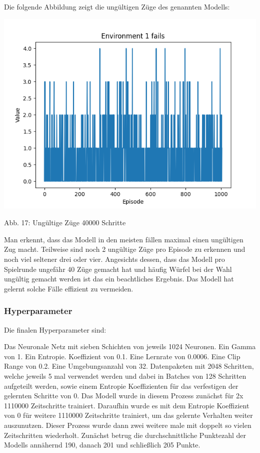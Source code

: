 \begin{minipage}{\linewidth}
	Die folgende Abbildung zeigt die ungültigen Züge des genannten Modells:
	
	\vspace{0.5cm}
	\includegraphics[width=1\textwidth]{Bilder/maskableppo_ganzschoenclever_193avg_v3.1f}
	
	Abb. 17: Ungültige Züge 40000 Schritte\\
\end{minipage}

Man erkennt, dass das Modell in den meisten fällen maximal einen ungültigen Zug macht. Teilweise sind noch 2 ungültige Züge pro Episode zu erkennen und noch viel seltener drei oder vier. Angesichts dessen, dass das Modell pro Spielrunde ungefähr 40 Züge gemacht hat und häufig Würfel bei der Wahl ungültig gemacht werden ist das ein beachtliches Ergebnis. Das Modell hat gelernt solche Fälle effizient zu vermeiden.
\subsubsection{Hyperparameter}
Die finalen Hyperparameter sind:

Das Neuronale Netz mit sieben Schichten von jeweils 1024 Neuronen. Ein Gamma von 1. Ein Entropie. Koeffizient von 0.1. Eine Lernrate von 0.0006. Eine Clip Range von 0.2. Eine Umgebungsanzahl von 32. Datenpaketen mit 2048 Schritten, welche jeweils 5 mal verwendet werden und dabei in Batches von 128 Schritten aufgeteilt werden, sowie einem Entropie Koeffizienten für das verfestigen der gelernten Schritte von 0. Das Modell wurde in diesem Prozess zunächst für 2x 1110000 Zeitschritte trainiert. Daraufhin wurde es mit dem Entropie Koeffizient von 0 für weitere 1110000 Zeitschritte trainiert, um das gelernte Verhalten weiter auszunutzen. Dieser Prozess wurde dann zwei weitere male mit doppelt so vielen Zeitschritten wiederholt. Zunächst betrug die durchschnittliche Punktezahl der Modells annähernd 190, danach 201 und schließlich 205 Punkte.

